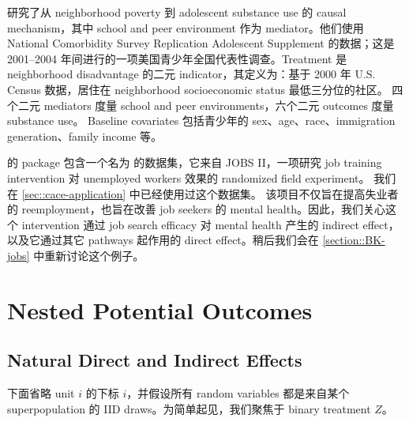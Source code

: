 \begin{example}
\citet{rudolph2018causal} 研究了从 neighborhood poverty 到 adolescent substance use 的 causal mechanism，其中 school and peer environment 作为 mediator。他们使用 National Comorbidity Survey Replication Adolescent Supplement 的数据；这是 2001--2004 年间进行的一项美国青少年全国代表性调查。Treatment 是 neighborhood disadvantage 的二元 indicator，其定义为：基于 2000 年 U.S. Census 数据，居住在 neighborhood socioeconomic status 最低三分位的社区。
四个二元 mediators 度量 school and peer environments，六个二元 outcomes 度量 substance use。
Baseline covariates 包括青少年的 sex、age、race、immigration generation、family income 等。
\end{example}


\begin{example}\label{eg::mediation-jobs}
 的  package 包含一个名为  的数据集，它来自 JOBS II，一项研究 job training intervention 对 unemployed workers 效果的 randomized field experiment。
我们在 \cref{sec::cace-application} 中已经使用过这个数据集。
该项目不仅旨在提高失业者的 reemployment，也旨在改善 job seekers 的 mental health。因此，我们关心这个 intervention 通过 job search efficacy 对 mental health 产生的 indirect effect，以及它通过其它 pathways 起作用的 direct effect。稍后我们会在 \cref{section::BK-jobs} 中重新讨论这个例子。
\end{example}



\section{Nested Potential Outcomes}


\subsection{Natural Direct and Indirect Effects}
下面省略 unit $i$ 的下标 $i$，并假设所有 random variables 都是来自某个 superpopulation 的 IID draws。为简单起见，我们聚焦于 binary treatment $Z$。

